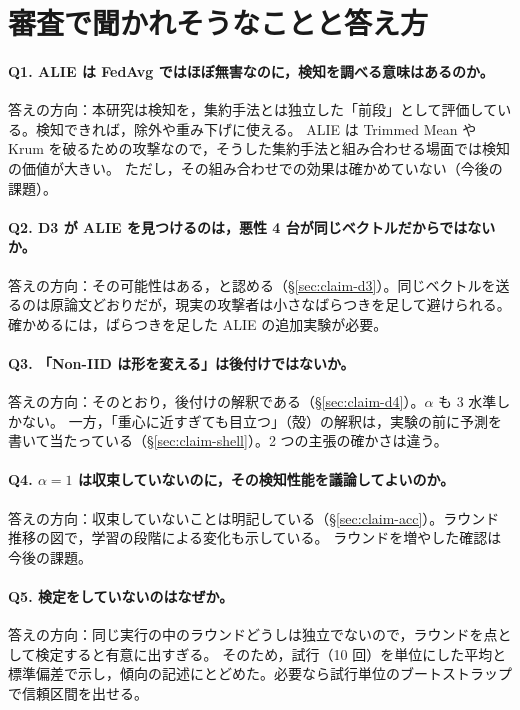 \documentclass[a4j, dvipdfmx]{jsarticle}  %
\begin{document}
\section{審査で聞かれそうなことと答え方}
\label{sec:claims-qa}

\paragraph{Q1. ALIE は FedAvg ではほぼ無害なのに，検知を調べる意味はあるのか。}
答えの方向：本研究は検知を，集約手法とは独立した「前段」として評価している。検知できれば，除外や重み下げに使える。
ALIE は Trimmed Mean や Krum を破るための攻撃なので，そうした集約手法と組み合わせる場面では検知の価値が大きい。
ただし，その組み合わせでの効果は確かめていない（今後の課題）。

\paragraph{Q2. D3 が ALIE を見つけるのは，悪性 4 台が同じベクトルだからではないか。}
答えの方向：その可能性はある，と認める（\S\ref{sec:claim-d3}）。同じベクトルを送るのは原論文どおりだが，現実の攻撃者は小さなばらつきを足して避けられる。
確かめるには，ばらつきを足した ALIE の追加実験が必要。

\paragraph{Q3. 「Non-IID は形を変える」は後付けではないか。}
答えの方向：そのとおり，後付けの解釈である（\S\ref{sec:claim-d4}）。$\alpha$ も 3 水準しかない。
一方，「重心に近すぎても目立つ」（殻）の解釈は，実験の前に予測を書いて当たっている（\S\ref{sec:claim-shell}）。2 つの主張の確かさは違う。

\paragraph{Q4. $\alpha = 1$ は収束していないのに，その検知性能を議論してよいのか。}
答えの方向：収束していないことは明記している（\S\ref{sec:claim-acc}）。ラウンド推移の図で，学習の段階による変化も示している。
ラウンドを増やした確認は今後の課題。

\paragraph{Q5. 検定をしていないのはなぜか。}
答えの方向：同じ実行の中のラウンドどうしは独立でないので，ラウンドを点として検定すると有意に出すぎる。
そのため，試行（10 回）を単位にした平均と標準偏差で示し，傾向の記述にとどめた。必要なら試行単位のブートストラップで信頼区間を出せる。
\end{document}
